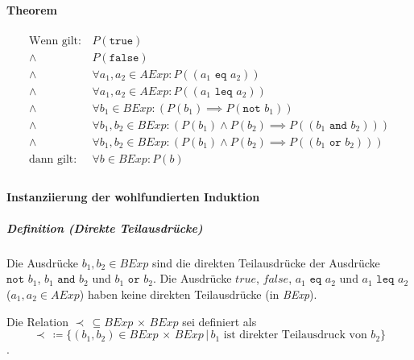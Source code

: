 \documentclass[a4paper, 11pt, accentcolor = tud3b]{tudreport}
\newcommand{\forwhich}{\ensuremath{{\,\vert\,}}}
\newcommand{\definition}[2]{\subparagraph{Definition (#1)} #2}
\begin{document}
				    \paragraph{Theorem}
					    \begin{align*}
						    \text{Wenn gilt:} & \,P(\texttt{true}) \\
						    \land & \,P(\texttt{false}) \\
						    \land & \,\forall a _ 1, a _ 2 \in \textit{AExp} : P((a _ 1 \texttt{ eq } a _ 2)) \\
						    \land & \,\forall a _ 1, a _ 2 \in \textit{AExp} : P((a _ 1 \texttt{ leq } a _ 2)) \\
						    \land & \,\forall b _ 1 \in \textit{BExp} : (P(b _ 1) \implies P(\texttt{not } b _ 1)) \\
						    \land & \,\forall b _ 1, b _ 2 \in \textit{BExp} : (P(b _ 1) \land P(b _ 2) \implies P((b _ 1 \texttt{ and } b _ 2))) \\
						    \land & \,\forall b _ 1, b _ 2 \in \textit{BExp} : (P(b _ 1) \land P(b _ 2) \implies P((b _ 1 \texttt{ or } b _ 2))) \\
						    \text{dann gilt:} & \,\forall b \in \textit{BExp} : P(b) \\
					    \end{align*}
			    
				    \paragraph{Instanziierung der wohlfundierten Induktion}
					    \definition{Direkte Teilausdrücke}{Die Ausdrücke $ b _ 1, b _ 2 \in \textit{BExp} $ sind die direkten Teilausdrücke der Ausdrücke $ \texttt{not } b _ 1 $, $ b _ 1 \texttt{ and } b _ 2 $ und $ b _ 1 \texttt{ or } b _ 2 $. Die Ausdrücke $ true $, $ false $, $ a _ 1 \texttt{ eq } a _ 2 $ und $ a _ 1 \texttt{ leq } a _ 2 $ ($ a _ 1, a _ 2 \in \textit{AExp} $) haben keine direkten Teilausdrücke (in \textit{BExp}).}
					    
					    Die Relation $ \prec \,\subseteq \textit{BExp} \,\times\, \textit{BExp} $ sei definiert als \[ \prec \,\coloneqq \{ (b _ 1, b _ 2) \in \textit{BExp} \,\times\, \textit{BExp} \forwhich b _ 1 \text{ ist direkter Teilausdruck von } b _ 2 \} \].
					    
\end{document}
